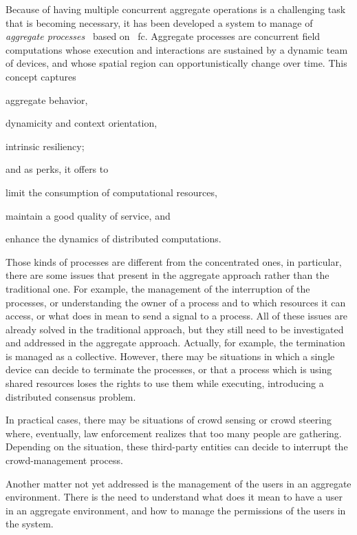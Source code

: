\documentclass[12pt, a4paper]{article}
\newenvironment{inlinelist}{\begin{enumerate*}[label=\emph{(\roman*)}]}{\end{enumerate*}}
\begin{document}
Because of having multiple concurrent aggregate operations is a challenging task that is becoming necessary,
it has been developed a system to manage of \emph{aggregate processes}~\cite{aggregate-processes} based on ~\ac{fc}.
%
Aggregate processes are concurrent field computations whose execution and interactions are sustained by a dynamic team of devices,
and whose spatial region can opportunistically change over time.
%
This concept captures
\begin{inlinelist}
    \item aggregate behavior,
    \item dynamicity and context orientation,
    \item intrinsic resiliency;
\end{inlinelist}
and as perks, it offers to
\begin{inlinelist}
    \item limit the consumption of computational resources,
    \item maintain a good quality of service, and
    \item enhance the dynamics of distributed computations.
\end{inlinelist}

Those kinds of processes are different from the concentrated ones,
in particular,
there are some issues that present in the aggregate approach rather than the traditional one.
%
For example,
the management of the interruption of the processes,
or understanding the owner of a process and to which resources it can access,
or what does in mean to send a signal to a process.
%
All of these issues are already solved in the traditional approach,
but they still need to be investigated and addressed in the aggregate approach.
%
Actually, for example,
the termination is managed as a collective.
%
However,
there may be situations in which a single device can decide to terminate the processes,
or that a process which is using shared resources loses the rights to use them while executing,
introducing a distributed consensus problem.

In practical cases, there may be situations of crowd sensing or crowd steering where,
eventually,
law enforcement realizes that too many people are gathering.
%
Depending on the situation,
these third-party entities can decide to interrupt the crowd-management process.

Another matter not yet addressed is the management of the users in an aggregate environment.
%
There is the need to understand what does it mean to have a user in an aggregate environment,
and how to manage the permissions of the users in the system.
\end{document}
